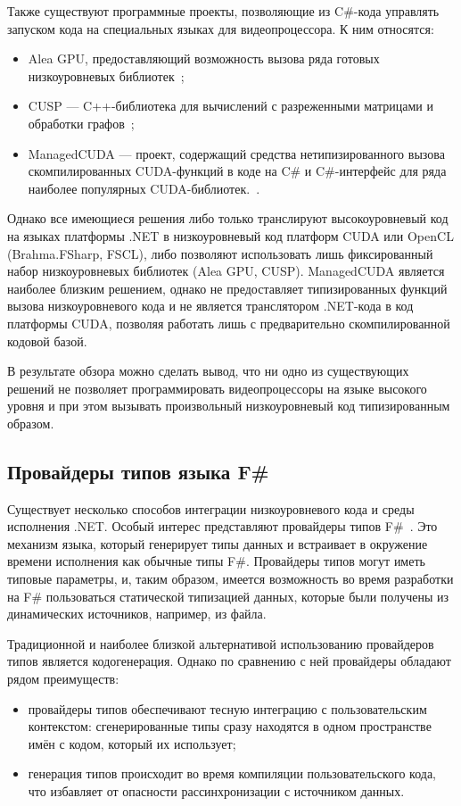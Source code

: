 Также существуют программные проекты, позволяющие из C\#-кода управлять запуском кода на специальных языках для видеопроцессора. К ним относятся:
\begin{itemize}
    \item Alea GPU, предоставляющий возможность вызова ряда готовых низкоуровневых библиотек~\cite{AleaGPU};
    \item CUSP --- C++-библиотека для вычислений с разреженными матрицами и обработки графов~\cite{CUSP};
    \item ManagedCUDA --- проект, содержащий средства нетипизированного вызова скомпилированных CUDA-функций в коде на C\# и C\#-интерфейс для ряда наиболее популярных CUDA-библиотек.~\cite{ManagedCUDA}.
\end{itemize}

Однако все имеющиеся решения либо только транслируют высокоуровневый код на языках платформы .NET в низкоуровневый код платформ CUDA или OpenCL (Brahma.FSharp, FSCL), либо позволяют использовать лишь фиксированный набор низкоуровневых библиотек (Alea GPU, CUSP). ManagedCUDA является наиболее близким решением, однако не предоставляет типизированных функций вызова низкоуровневого кода и не является транслятором .NET-кода в код платформы CUDA, позволяя работать лишь с предварительно скомпилированной кодовой базой.

В результате обзора можно сделать вывод, что ни одно из существующих решений не позволяет программировать видеопроцессоры на языке высокого уровня и при этом вызывать произвольный низкоуровневый код типизированным образом.

\subsection{Провайдеры типов языка F\#}
Существует несколько способов интеграции низкоуровневого кода и среды исполнения .NET. Особый интерес представляют провайдеры типов F\#~\cite{TypeProviders}. Это механизм языка, который генерирует типы данных и встраивает в окружение времени исполнения как обычные типы F\#. Провайдеры типов могут иметь типовые параметры, и, таким образом, имеется возможность во время разработки на F\# пользоваться статической типизацией данных, которые были получены из динамических источников, например, из файла.

Традиционной и наиболее близкой альтернативой использованию провайдеров типов является кодогенерация. Однако по сравнению с ней провайдеры обладают рядом преимуществ:
\begin{itemize}
    \item провайдеры типов обеспечивают тесную интеграцию с пользовательским контекстом: сгенерированные типы сразу находятся в одном пространстве имён с кодом, который их использует;
    \item генерация типов происходит во время компиляции пользовательского кода, что избавляет от опасности рассинхронизации с источником данных.
\end{itemize}

